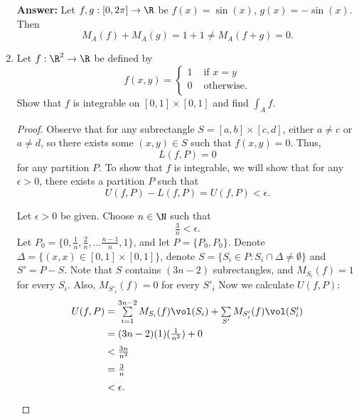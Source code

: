 \documentclass[letterpaper]{article}
\begin{document}
\begin{enumerate}
\textbf{Answer:} Let $f,g:[0,2\pi]\to\R$ be $f(x)=\sin(x)$, $g(x)=-\sin(x)$. Then 
$$M_A(f)+M_A(g) = 1+1 \neq M_A(f+g) = 0.$$


\item Let $f:\R^2\to\R$ be defined by 
\[
f(x,y)=
\begin{cases}
1 & \text{ if }x=y\\
0 & \text{ otherwise.}\\
\end{cases}
\]
Show that $f$ is integrable on $[0,1]\times[0,1]$ and find $\int_A f$. 
\begin{proof}
Observe that for any subrectangle $S=[a,b]\times[c,d]$, either $a\neq c$ or $a\neq d$, so there exists some $(x,y)\in S$ such that $f(x,y)=0$. Thus, 
$$L(f,P)=0$$ 
for any partition $P$. To show that $f$ is integrable, we will show that for any $\epsilon>0$, there exists a partition $P$ such that 
$$U(f,P)-L(f,P)=U(f,P)<\epsilon.$$

\pagebreak
Let $\epsilon>0$ be given. Choose $n\in\N$ such that
$$\tfrac{3}{n}<\epsilon.$$
Let $P_0=\{0, \frac{1}{n}, \frac{2}{n}, \dots \frac{n-1}{n}, 1\}$, and let $P=\{P_0,P_0\}$. 
Denote $\Delta=\{(x,x)\in [0,1]\times[0,1]\}$, denote $S=\{S_i\in P : S_i\cap\Delta\neq\emptyset\}$ and $S'=P-S$. Note that $S$ contains $(3n-2)$ subrectangles, and $M_{S_i}(f)=1$ for every $S_i$. Also, $M_{S'_i}(f)=0$ for every $S'_i$ Now we calculate $U(f,P)$:
\[
\arraycolsep=1.4pt\def\arraystretch{1.5}
\begin{array}{rcl}
U(f,P) &=& \sum\limits_{i=1}^{3n-2} M_{S_i}(f)\vol(S_i)+\sum\limits_{S'} M_{S'_i}(f)\vol(S'_i)\\
&=& (3n-2)(1)(\frac{1}{n^2}) + 0\\
&<& \frac{3n}{n^2}\\
&=& \frac{3}{n}\\
&<& \epsilon. \\
\end{array}
\]

\end{proof}


\end{enumerate}
\end{document}
